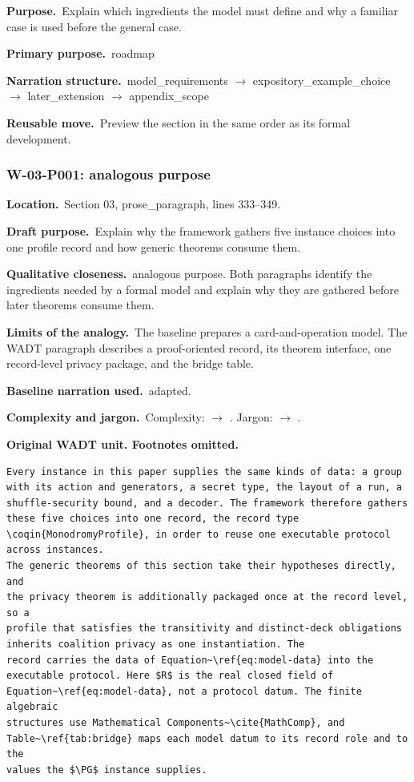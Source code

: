 \documentclass[10pt]{article}
\renewcommand{\cite}[1]{\textnormal{[\texttt{\detokenize{#1}}]}}\renewcommand{\label}[1]{}
\newcommand{\Field}[2]{\textbf{#1}\ #2\par}\newcommand{\Tag}[1]{\fcolorbox{black!25}{black!4}{\strut\scriptsize #1}}
\begin{document}
\colorbox{BaselineBlue}{\parbox{0.97\textwidth}{\Field{Purpose.}{Explain which ingredients the model must define and why a familiar case is used before the general case.}\Field{Primary purpose.}{roadmap}\Field{Narration structure.}{model\_requirements $\rightarrow$ expository\_example\_choice $\rightarrow$ later\_extension $\rightarrow$ appendix\_scope}\Field{Reusable move.}{Preview the section in the same order as its formal development.}}}
\subsubsection*{W-03-P001: analogous purpose}
\Field{Location.}{Section 03, prose\_paragraph, lines 333--349.}
\Field{Draft purpose.}{Explain why the framework gathers five instance choices into one profile record and how generic theorems consume them.}
\Field{Qualitative closeness.}{analogous purpose. Both paragraphs identify the ingredients needed by a formal model and explain why they are gathered before later theorems consume them.}
\Field{Limits of the analogy.}{The baseline prepares a card-and-operation model. The WADT paragraph describes a proof-oriented record, its theorem interface, one record-level privacy package, and the bridge table.}
\Field{Baseline narration used.}{adapted.}
\Field{Complexity and jargon.}{Complexity: \Tag{high} $\rightarrow$ \Tag{medium}. Jargon: \Tag{high} $\rightarrow$ \Tag{medium}.}
\textbf{Original WADT unit. Footnotes omitted.}
\begin{lstlisting}
Every instance in this paper supplies the same kinds of data: a group
with its action and generators, a secret type, the layout of a run, a
shuffle-security bound, and a decoder. The framework therefore gathers
these five choices into one record, the record type
\coqin{MonodromyProfile}, in order to reuse one executable protocol
across instances.
The generic theorems of this section take their hypotheses directly, and
the privacy theorem is additionally packaged once at the record level, so a
profile that satisfies the transitivity and distinct-deck obligations
inherits coalition privacy as one instantiation. The
record carries the data of Equation~\ref{eq:model-data} into the
executable protocol. Here $R$ is the real closed field of
Equation~\ref{eq:model-data}, not a protocol datum. The finite algebraic
structures use Mathematical Components~\cite{MathComp}, and
Table~\ref{tab:bridge} maps each model datum to its record role and to the
values the $\PG$ instance supplies.
\end{lstlisting}
\end{document}
